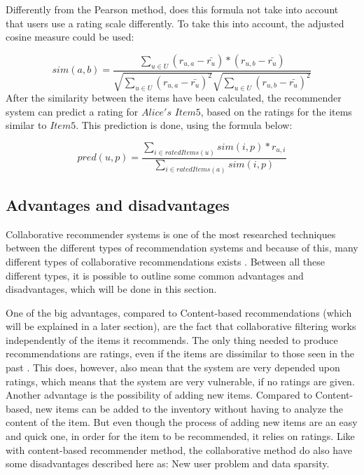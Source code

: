 Differently from the Pearson method, does this formula not take into account that users use a rating scale differently. To take this into account, the adjusted cosine measure could be used:

\[
	sim(a,b) = \frac{\sum_{u \in U}(r_{u,a} - \bar{r_{u}})*(r_{u,b} - \bar{r_{u}})}{\sqrt{\sum_{u \in U}(r_{u,a} - \bar{r_{u}})^2}\sqrt{\sum_{u \in U} (r_{u,b} - \bar{r_{u}})^2}}
\]
After the similarity between the items have been calculated, the recommender system can predict a rating for \(Alice's\) \(Item5\), based on the ratings for the items similar to \(Item5\). This prediction is done, using the formula below:

\[
	pred(u,p) = \frac{\sum_{i\in ratedItems(u)} sim(i,p) * r_{u,i}}{\sum_{i \in ratedItems(a)} sim(i,p)}
\]


\subsection{Advantages and disadvantages}
Collaborative recommender systems is one of the most researched techniques between the different types of recommendation systems and because of this, many different types of collaborative recommendations exists \citep{IntroductionRecommenderSystems}. Between all these different types, it is possible to outline some common advantages and disadvantages, which will be done in this section.\newline

One of the big advantages, compared to Content-based recommendations (which will be explained in a later section), are the fact that collaborative filtering works independently of the items it recommends. The only thing needed to produce recommendations are ratings, even if the items are dissimilar to those seen in the past \citep[p. 18]{TowardsTheNextGenerationOfRs}. This does, however, also mean that the system are very depended upon ratings, which means that the system are very vulnerable, if no ratings are given. Another advantage is the possibility of adding new items. Compared to Content-based, new items can be added to the inventory without having to analyze the content of the item. But even though the process of adding new items are an easy and quick one, in order for the item to be recommended, it relies on ratings.\newline 
Like with content-based recommender method, the collaborative method do also have some disadvantages described here as: New user problem and data sparsity.\newline

